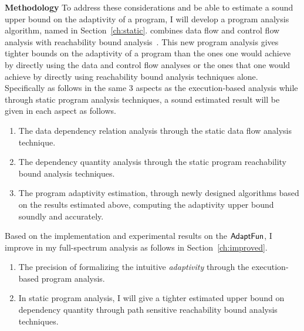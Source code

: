 \begin{itemize}
\textbf{Methodology}
To address these considerations and be able to estimate a sound upper bound on the adaptivity of a program, 
I will develop a program analysis algorithm, named {\THESYSTEM} in Section~\ref{ch:static}.
{\THESYSTEM} combines data flow and control flow analysis with reachability bound analysis~\cite{GulwaniZ10}. 
This new program analysis gives tighter bounds on the adaptivity of a program than the ones one would achieve by directly using the data and control flow analyses or the ones that one would achieve by directly using reachability bound analysis techniques alone. Specifically as follows in the same 3 aspects as the execution-based analysis 
while through static program analysis techniques, a sound estimated result will be given in each aspect as follows.
\begin{enumerate}
\item The data dependency relation analysis through the static data flow analysis technique.
\item The dependency quantity analysis through the static program reachability bound analysis techniques.
\item The program adaptivity estimation, through newly designed algorithms based on the results estimated above, 
computing the adaptivity upper bound soundly 
and accurately.
\end{enumerate}
\end{itemize}%

Based on the implementation and experimental results on the $\textsf{AdaptFun}$,
I 
improve in my full-spectrum analysis as follows in Section~\ref{ch:improved}.
\begin{enumerate}
 \item The precision of formalizing the intuitive \emph{adaptivity} 
through the execution-based program analysis.

\item In static program analysis, I will give a tighter estimated upper bound on dependency quantity through 
path sensitive reachability bound analysis techniques. 

\end{enumerate}

